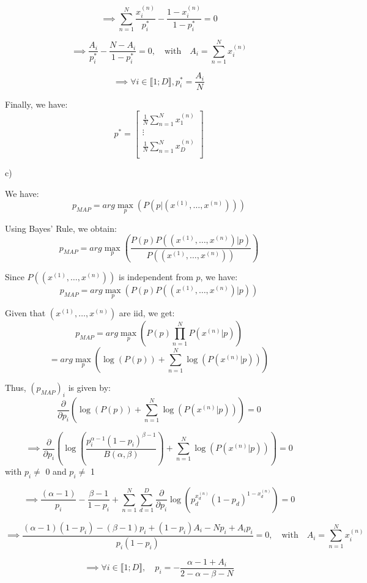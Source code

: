 \documentclass[12pt,a4paper]{report} %
\begin{document}
\[
\implies \sum_{n=1}^{N} \frac{x_i^{(n)}}{p_i^*} - \frac{1-x_i^{(n)}}{1-p_i^*} = 0
\]

\[
\implies \frac{A_i}{p_i^*} - \frac{N-A_i}{1 - p_i^*} = 0, \quad \text{with} \quad A_i = \sum_{n=1}^{N} x_i^{(n)}
\]

\[
\implies \forall i \in \llbracket1; D\rrbracket, p_i^* = \frac{A_i}{N}
\]

Finally, we have:
\[
p^* = \begin{bmatrix}
\frac{1}{N} \sum_{n=1}^{N} x_1^{(n)} \\
\vdots \\
\frac{1}{N} \sum_{n=1}^{N} x_D^{(n)} \\
\end{bmatrix}
\]

\item c)

We have:
\[
p_{MAP} = arg \max_p \left( P(p | (x^{(1)}, \dots, x^{(n)})) \right)
\]

Using Bayes' Rule, we obtain:
\[
p_{MAP} = arg \max_p \left( \frac{P(p) P((x^{(1)}, \dots, x^{(n)}) | p)}{P((x^{(1)}, \dots, x^{(n)}))} \right)
\]

Since \( P((x^{(1)}, \dots, x^{(n)})) \) is independent from \( p \), we have:
\[
p_{MAP} = arg \max_p \left( P(p) P((x^{(1)}, \dots, x^{(n)}) | p) \right)
\]

Given that \( (x^{(1)}, \dots, x^{(n)}) \) are iid, we get:
\[
p_{MAP} = arg\max_p \left( P(p) \prod_{n=1}^{N} P(x^{(n)} | p) \right)
\]
\[
= arg\max_p \left( \log(P(p)) + \sum_{n=1}^{N} \log(P(x^{(n)} | p)) \right)
\]

Thus, \( (p_{MAP})_i \) is given by:
\[
\frac{\partial}{\partial p_i} \left( \log(P(p)) + \sum_{n=1}^{N} \log(P(x^{(n)} | p)) \right) = 0
\]

\[
\implies \frac{\partial}{\partial p_i} \left( \log\left( \frac{p_i^{\alpha-1}(1-p_i)^{\beta-1}}{B(\alpha, \beta)} \right) + \sum_{n=1}^{N} \log(P(x^{(n)} | p)) \right) = 0 \]
with $p_i\neq$ 0 and $p_i\neq$ 1


\[
\implies \frac{(\alpha - 1)}{p_i} - \frac{\beta - 1}{1 - p_i} + \sum_{n=1}^{N} \sum_{d=1}^{D} \frac{\partial}{\partial p_i} \log \left( p_d^{x_d^{(n)}} (1-p_d)^{1-x_d^{(n)}} \right) = 0
\]


\[
\implies \frac{(\alpha - 1)(1 - p_i) - (\beta - 1)p_i + (1 - p_i)A_i - Np_i + A_ip_i}{p_i(1 - p_i)} = 0, \quad \text{with} \quad A_i = \sum_{n=1}^{N} x_i^{(n)}
\]

\[
\implies \forall i \in \llbracket 1; D \rrbracket, \quad p_i = - \frac{\alpha - 1 + A_i}{2 - \alpha - \beta - N}
\]
\end{document}
